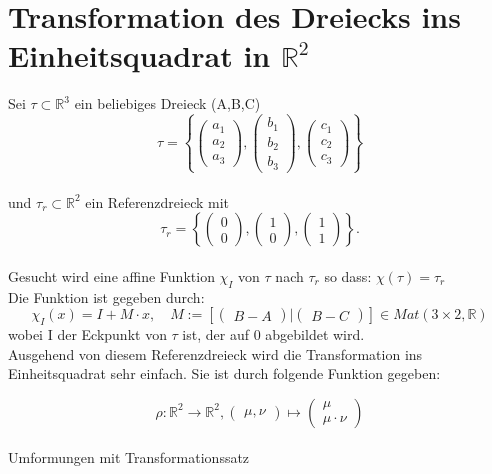 \documentclass[12pt]{article}
\begin{document}
\section{Transformation des Dreiecks ins \\ Einheitsquadrat in $\mathbb{R}^2$}
Sei $\tau\subset \mathbb{R}^3$ ein beliebiges Dreieck (A,B,C)
\[
\tau = \left \{
\begin{pmatrix} a_1\\ a_2 \\ a_3 \end{pmatrix}
,
\begin{pmatrix} b_1\\ b_2 \\ b_3 \end{pmatrix}
,
\begin{pmatrix} c_1\\ c_2 \\ c_3 \end{pmatrix}
\right \}
\]
\\
und $\tau_r \subset \mathbb{R}^2$ ein Referenzdreieck mit
\[
 \tau_r = \left \{
\begin{pmatrix} 0\\ 0 \end{pmatrix}
,
\begin{pmatrix} 1\\ 0\end{pmatrix}
,
\begin{pmatrix} 1\\ 1\end{pmatrix}
\right \} .
\]
\\
Gesucht wird eine affine Funktion $\chi_I$ von $\tau$ nach $\tau_r$ so dass: $\chi(\tau) = \tau_r$
\\
Die Funktion ist gegeben durch:
\[
\chi_I(x) = I + M\cdot x, \quad M := \left[
\begin{pmatrix} B-A \end{pmatrix}
|
\begin{pmatrix} B-C \end{pmatrix}
\right]
 \in Mat(3\times 2,\mathbb{R})
\]
wobei I der Eckpunkt von $\tau$ ist, der auf 0 abgebildet wird.
\\
Ausgehend von diesem Referenzdreieck wird die Transformation ins Einheitsquadrat sehr einfach. Sie ist durch folgende Funktion gegeben:

\[
\rho : \mathbb{R}^2 \rightarrow \mathbb{R}^2, \begin{pmatrix} \mu,\nu \end{pmatrix} \mapsto \begin{pmatrix} \mu\\\mu\cdot\nu \end{pmatrix}
\]
\\
Umformungen mit Transformationssatz
\newpage
\end{document}
